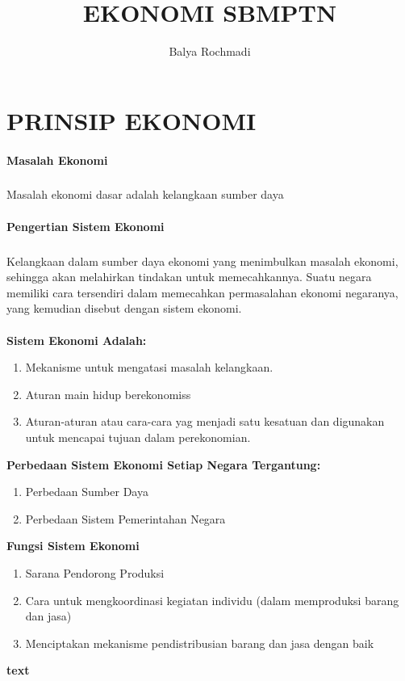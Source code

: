 \documentclass[12pt,a4paper,twoside]{article}
\author{Balya Rochmadi}
\title{EKONOMI SBMPTN}
\begin{document}
	\section{PRINSIP EKONOMI}
	\paragraph {Masalah Ekonomi}
	\subparagraph{}
		Masalah ekonomi dasar adalah kelangkaan sumber daya
	\paragraph{Pengertian Sistem Ekonomi}
	\subparagraph{}
	Kelangkaan dalam sumber daya ekonomi yang menimbulkan masalah ekonomi, sehingga akan melahirkan tindakan untuk memecahkannya. Suatu negara memiliki cara tersendiri dalam memecahkan permasalahan ekonomi negaranya, yang kemudian disebut dengan sistem ekonomi.
	\paragraph{}
	\textbf{Sistem Ekonomi Adalah: }
	\begin{enumerate}
		\item Mekanisme untuk mengatasi masalah kelangkaan.
		\item Aturan main hidup berekonomiss
		\item Aturan-aturan atau cara-cara yag menjadi satu kesatuan dan digunakan untuk mencapai tujuan dalam perekonomian.
	\end{enumerate}
	
	\textbf{Perbedaan Sistem Ekonomi Setiap Negara Tergantung:}
	\begin{enumerate}
		\item Perbedaan Sumber Daya
		\item Perbedaan Sistem Pemerintahan Negara
	\end{enumerate}
	
	\textbf{Fungsi Sistem Ekonomi}
	\begin{enumerate}
		\item Sarana Pendorong Produksi
		\item Cara untuk mengkoordinasi kegiatan individu (dalam memproduksi barang dan jasa)
		\item Menciptakan mekanisme pendistribusian barang dan jasa dengan baik
	\end{enumerate}

	\textbf{text}
		
		
		
		
\end{document}
